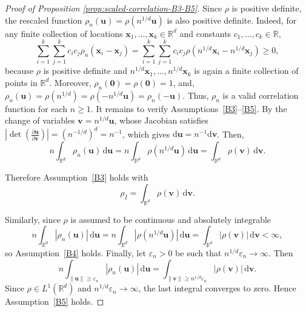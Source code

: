 \documentclass[12pt]{report} %
\newcommand{\bx}{\mathbf{x}}
\newcommand{\bv}{\mathbf{v}}
\newcommand{\bu}{\boldsymbol{u}}
\newcommand{\rd}{\mathrm{d}}
\begin{document}
\begin{proof}[Proof of Proposition \ref{prop:scaled-correlation-B3-B5}] \label{proof:proposition-corr}
Since $\rho$ is positive definite, the rescaled function
$\rho_n(\bu)=\rho(n^{1/d}\bu)$ is also positive definite. Indeed, for any finite collection of locations $\bx_1,\ldots,\bx_k\in\mathbb{R}^d$ and constants
$c_1,\ldots,c_k\in\mathbb{R}$,
\[
    \sum_{i=1}^k\sum_{j=1}^k
    c_i c_j \rho_n(\bx_i-\bx_j)
    =
    \sum_{i=1}^k\sum_{j=1}^k
    c_i c_j \rho(n^{1/d}\bx_i-n^{1/d}\bx_j)
    \geq 0,
\]
because $\rho$ is positive definite and
$n^{1/d}\bx_1,\ldots,n^{1/d}\bx_k$ is again a finite collection of points in
$\mathbb{R}^d$. Moreover, $\rho_n(\mathbf{0})=\rho(\mathbf{0})=1$, and, $\rho_n(\bu) = \rho(n^{1/d}) = \rho(-n^{1/d}\bu) = \rho_n(-\bu)$. Thus, $\rho_n$ is a valid correlation function for each $n \geq 1$.  It remains to verify Assumptions~\ref{B3}--\ref{B5}. By the change of variables $\bv=n^{1/d}\bu$,  whose Jacobian satisfies $\left| \det\!\left(\frac{\partial \bu}{\partial \bv}\right) \right| =  \left(n^{-1/d}\right)^d =  n^{-1}$, which gives $\rd\bu=n^{-1}\rd\bv$. Then, 
\begin{equation*}
    n\int_{\mathbb{R}^d}\rho_n(\bu)\,\rd\bu = n\int_{\mathbb{R}^d}\rho(n^{1/d}\bu)\,\rd\bu = \int_{\mathbb{R}^d}\rho(\bv)\,\rd\bv.
\end{equation*}

Therefore Assumption~\ref{B3} holds with
\begin{equation*}
    \rho_I=\int_{\mathbb{R}^d}\rho(\bv)\,\rd\bv.
\end{equation*}

Similarly, since $\rho$ is assumed to be continuous and absolutely integrable
\begin{equation*}
    n\int_{\mathbb{R}^d}|\rho_n(\bu)|\,\rd\bu
    = n\int_{\mathbb{R}^d}|\rho(n^{1/d}\bu)|\,\rd\bu =
    \int_{\mathbb{R}^d}|\rho(\bv)|\,\rd\bv<\infty,
\end{equation*}
so Assumption~\ref{B4} holds. Finally, let $\varepsilon_n>0$ be such that
$n^{1/d}\varepsilon_n\to\infty$. Then
\begin{equation*}
     n\int_{\|\bu\|\geq \varepsilon_n}
    |\rho_n(\bu)|\,\rd\bu=
    \int_{\|\bv\|\geq n^{1/d}\varepsilon_n}
    |\rho(\bv)|\,\rd\bv.
\end{equation*}
Since $\rho\in L^1(\mathbb{R}^d)$ and
$n^{1/d}\varepsilon_n\to\infty$, the last integral converges to zero. Hence Assumption~\ref{B5} holds.
\end{proof}
\end{document}
